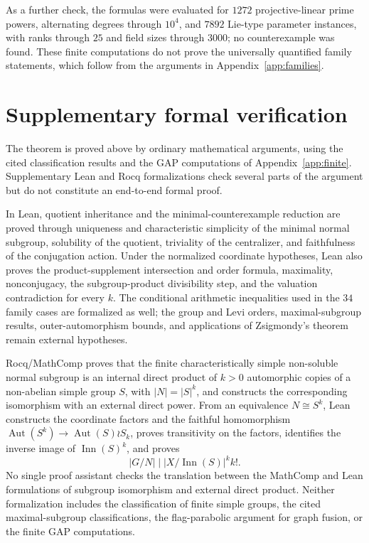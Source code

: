 \documentclass[11pt]{amsart}
\theoremstyle{definition}
\theoremstyle{remark}
\DeclareMathOperator{\Inn}{Inn}
\DeclareMathOperator{\Aut}{Aut}
\begin{document}
As a further check, the formulas were evaluated for $1272$ projective-linear
prime powers, alternating degrees through $10^4$, and $7892$ Lie-type
parameter instances, with ranks through $25$ and field sizes through $3000$;
no counterexample was found. These finite computations do not prove the
universally quantified family statements, which follow from the arguments in
Appendix~\ref{app:families}.

\section{Supplementary formal verification}\label{app:trust}

The theorem is proved above by ordinary mathematical arguments, using the
cited classification results and the GAP computations of
Appendix~\ref{app:finite}. Supplementary Lean and Rocq formalizations check
several parts of the argument but do not constitute an end-to-end formal proof.

In Lean, quotient inheritance and the minimal-counterexample reduction are
proved through uniqueness and characteristic simplicity of the minimal normal
subgroup, solubility of the quotient, triviality of the centralizer, and
faithfulness of the conjugation action. Under the normalized coordinate
hypotheses, Lean also proves the product-supplement intersection and order
formula, maximality, nonconjugacy, the subgroup-product divisibility step, and
the valuation contradiction for every $k$. The conditional arithmetic
inequalities used in the $34$ family cases are formalized as well; the group
and Levi orders, maximal-subgroup results, outer-automorphism bounds, and
applications of Zsigmondy's theorem remain external hypotheses.

Rocq/MathComp proves that the finite characteristically simple non-soluble
normal subgroup is an internal direct product of $k>0$ automorphic copies of a
non-abelian simple group $S$, with $|N|=|S|^k$, and constructs the corresponding
isomorphism with an external direct power. From an equivalence $N\cong S^k$,
Lean constructs the coordinate factors and the faithful homomorphism
$\Aut(S^k)\to\Aut(S)\wr S_k$, proves transitivity on the factors, identifies
the inverse image of $\Inn(S)^k$, and proves
\[
 |G/N|\mid |X/\Inn(S)|^k k!.
\]
No single proof assistant checks the translation between the MathComp and Lean
formulations of subgroup isomorphism and external direct product. Neither
formalization includes the classification of finite simple groups, the cited
maximal-subgroup classifications, the flag-parabolic argument for graph
fusion, or the finite GAP computations.
\end{document}
